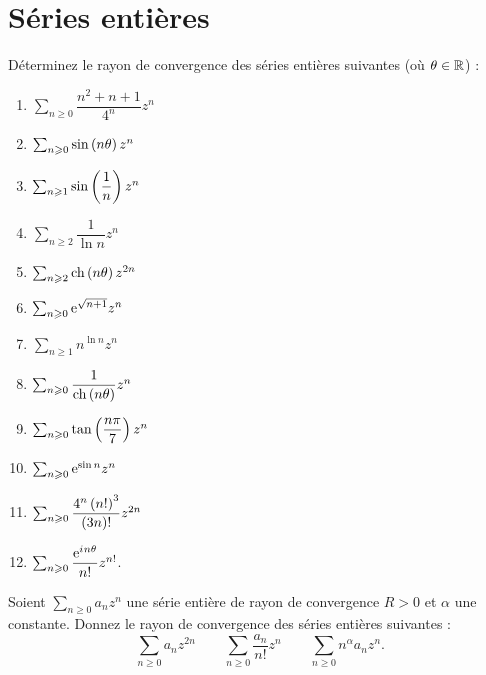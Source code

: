 \chapter{Séries entières}

\minitoc

\legendeexercices

\begin{exos}
Déterminez le rayon de convergence des séries entières suivantes (où \(\theta\in\mathbb{R}\)) :

\begin{enumerate}
    \item \(\sum_{n\geq0}\dfrac{n^2+n+1}{4^n}z^n\) \\
    \item \(\sum_{n\geqslant0}\sin\left(n\theta\right)z^n\) \\
    \item \(\sum_{n\geqslant1}\sin\left(\dfrac{1}{n}\right)z^n\) \\
    \item \(\sum_{n\geq2}\dfrac{1}{\ln n}z^n\) \\
    \item \(\sum_{n\geqslant2}\operatorname{ch}\left(n\theta\right)z^{2n}\) \\
    \item \(\sum_{n\geqslant0}\mathrm{e}^{\sqrt{n+1}}z^n\) \\
    \item \(\sum_{n\geq1}n^{\ln n}z^n\) \\
    \item \(\sum_{n\geqslant0}\dfrac{1}{\operatorname{ch}\left(n\theta\right)}z^n\) \\
    \item \(\sum_{n\geqslant0}\tan\left(\dfrac{n\pi}{7}\right)z^n\) \\
    \item \(\sum_{n\geqslant0}\mathrm{e}^{\sin n}z^n\) \\
    \item \(\sum_{n\geqslant0}\dfrac{4^n\left(n!\right)^3}{\left(3n\right)!}z^{2n}\) \\
    \item \(\sum_{n\geqslant0}\dfrac{\mathrm{e}^{i\mkern1mu n\theta}}{n!}z^{n!}\).
\end{enumerate}
\end{exos}

\begin{exos}
Soient \(\sum_{n\geq0}a_nz^n\) une série entière de rayon de convergence \(R>0\) et \(\alpha\) une constante. Donnez le rayon de convergence des séries entières suivantes : \[\sum_{n\geq0}a_nz^{2n}\qquad\sum_{n\geq0}\dfrac{a_n}{n!}z^n\qquad\sum_{n\geq0}n^\alpha a_nz^n.\]
\end{exos}

